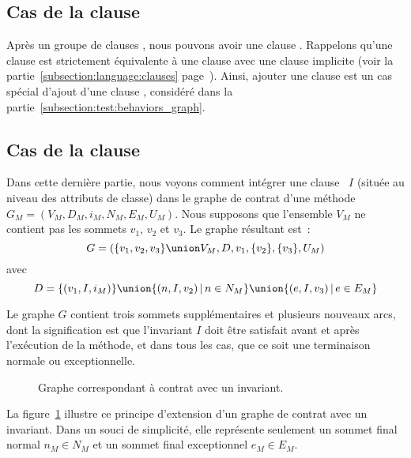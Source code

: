 \subsection{Cas de la clause \adefault}
\label{subsection:test:default_graph}

Après un groupe de clauses \abehavior, nous pouvons avoir une clause \adefault.
Rappelons qu'une clause \adefault est strictement équivalente à une clause
\abehavior avec une clause \arequires implicite (voir la
partie~\ref{subsection:language:clauses}
page~\pageref{subsection:language:clauses}). Ainsi, ajouter une clause \adefault
est un cas spécial d'ajout d'une clause \abehavior, considéré dans la
partie~\ref{subsection:test:behaviors_graph}.

\subsection{Cas de la clause \ainvariant}
\label{subsection:test:invariant_graph}

Dans cette dernière partie, nous voyons comment intégrer une clause
\ainvariant~$I$ (située au niveau des attributs de classe) dans le graphe de
contrat d'une méthode $G_M = (V_M, D_M, i_M, N_M, E_M, U_M)$. Nous supposons que
l'ensemble $V_M$ ne contient pas les sommets $v_1$, $v_2$ et $v_3$. Le graphe
résultant est~:
%
$$G = (
  \{v_1, v_2, v_3\} \union V_M,
  D,
  v_1,
  \{v_2\},
  \{v_3\},
  U_M
)$$
%
avec
%
$$D = \{(v_1, I, i_M)\} \union
      \{(n, I, v_2) \,\vert\, n \in N_M\} \union
      \{(e, I, v_3) \,\vert\, e \in E_M\}$$

Le graphe $G$ contient trois sommets supplémentaires et plusieurs nouveaux arcs,
dont la signification est que l'invariant $I$ doit être satisfait avant et après
l'exécution de la méthode, et dans tous les cas, que ce soit une terminaison
normale ou exceptionnelle.

\begin{figure}


\caption{\label{figure:test:invariant_graph} Graphe correspondant à contrat avec
un invariant.}

\end{figure}

\begin{example}

La figure~\ref{figure:test:invariant_graph} illustre ce principe d'extension
d'un graphe de contrat avec un invariant. Dans un souci de simplicité, elle
représente seulement un sommet final normal $n_M \in N_M$ et un sommet final
exceptionnel $e_M \in E_M$.

\end{example}
